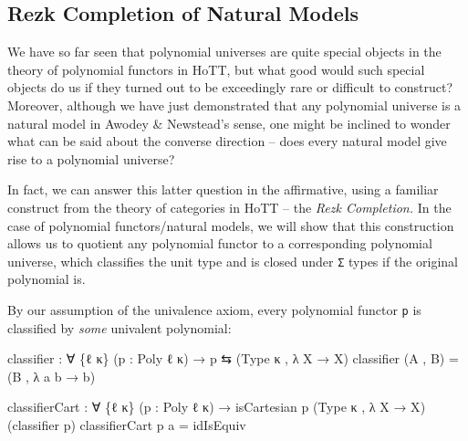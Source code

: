 \documentclass[
  11pt,
  oneside,
  article]{memoir}
\newenvironment{Shaded}{}{}
\newcommand{\NormalTok}[1]{#1}
\newcommand{\OtherTok}[1]{\textcolor[rgb]{0.00,0.44,0.13}{#1}}
\theoremstyle{definition}
\theoremstyle{plain}
\newcommand{\0}{\textsf{0}}
\newcommand{\1}{\tn{\textsf{1}}}
\begin{document}
\subsection{Rezk Completion of Natural
Models}\label{rezk-completion-of-natural-models}

We have so far seen that polynomial universes are quite special objects
in the theory of polynomial functors in HoTT, but what good would such
special objects do us if they turned out to be exceedingly rare or
difficult to construct? Moreover, although we have just demonstrated
that any polynomial universe is a natural model in Awodey \& Newstead's
sense, one might be inclined to wonder what can be said about the
converse direction -- does every natural model give rise to a polynomial
universe?

In fact, we can answer this latter question in the affirmative, using a
familiar construct from the theory of categories in HoTT -- the
\emph{Rezk Completion.} In the case of polynomial functors/natural
models, we will show that this construction allows us to quotient any
polynomial functor to a corresponding polynomial universe, which
classifies the unit type and is closed under \texttt{Σ} types if the
original polynomial is.

By our assumption of the univalence axiom, every polynomial functor
\texttt{p} is classified by \emph{some} univalent polynomial:

\begin{Shaded}
\begin{Highlighting}[]
\NormalTok{classifier }\OtherTok{:} \OtherTok{∀} \OtherTok{\{}\NormalTok{ℓ κ}\OtherTok{\}} \OtherTok{(}\NormalTok{p }\OtherTok{:}\NormalTok{ Poly ℓ κ}\OtherTok{)} \OtherTok{→}\NormalTok{ p ⇆ }\OtherTok{(}\NormalTok{Type κ , }\OtherTok{λ}\NormalTok{ X }\OtherTok{→}\NormalTok{ X}\OtherTok{)}
\NormalTok{classifier }\OtherTok{(}\NormalTok{A , B}\OtherTok{)} \OtherTok{=} \OtherTok{(}\NormalTok{B , }\OtherTok{λ}\NormalTok{ a b }\OtherTok{→}\NormalTok{ b}\OtherTok{)}

\NormalTok{classifierCart }\OtherTok{:} \OtherTok{∀} \OtherTok{\{}\NormalTok{ℓ κ}\OtherTok{\}} \OtherTok{(}\NormalTok{p }\OtherTok{:}\NormalTok{ Poly ℓ κ}\OtherTok{)} 
                 \OtherTok{→}\NormalTok{ isCartesian p }\OtherTok{(}\NormalTok{Type κ , }\OtherTok{λ}\NormalTok{ X }\OtherTok{→}\NormalTok{ X}\OtherTok{)}
                               \OtherTok{(}\NormalTok{classifier p}\OtherTok{)}
\NormalTok{classifierCart p a }\OtherTok{=}\NormalTok{ idIsEquiv}
\end{Highlighting}
\end{Shaded}
\end{document}

